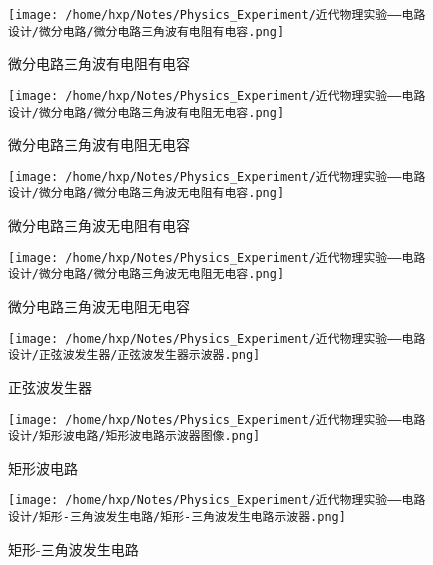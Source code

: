 \documentclass{article}
\begin{document}
\begin{figure}[H]
  \centering
  \texttt{[image: /home/hxp/Notes/Physics\_Experiment/近代物理实验——电路设计/微分电路/微分电路三角波有电阻有电容.png]}
  \caption{微分电路三角波有电阻有电容}
\end{figure}

\begin{figure}[H]
  \centering
  \texttt{[image: /home/hxp/Notes/Physics\_Experiment/近代物理实验——电路设计/微分电路/微分电路三角波有电阻无电容.png]}
  \caption{微分电路三角波有电阻无电容}
\end{figure}

\begin{figure}[H]
  \centering
  \texttt{[image: /home/hxp/Notes/Physics\_Experiment/近代物理实验——电路设计/微分电路/微分电路三角波无电阻有电容.png]}
  \caption{微分电路三角波无电阻有电容}
\end{figure}

\begin{figure}[H]
  \centering
  \texttt{[image: /home/hxp/Notes/Physics\_Experiment/近代物理实验——电路设计/微分电路/微分电路三角波无电阻无电容.png]}
  \caption{微分电路三角波无电阻无电容}
\end{figure}



\begin{figure}[H]
  \centering
  \texttt{[image: /home/hxp/Notes/Physics\_Experiment/近代物理实验——电路设计/正弦波发生器/正弦波发生器示波器.png]}
  \caption{正弦波发生器}
\end{figure}



\begin{figure}[H]
  \centering
  \texttt{[image: /home/hxp/Notes/Physics\_Experiment/近代物理实验——电路设计/矩形波电路/矩形波电路示波器图像.png]}
  \caption{矩形波电路}
\end{figure}



\begin{figure}[H]
  \centering
  \texttt{[image: /home/hxp/Notes/Physics\_Experiment/近代物理实验——电路设计/矩形-三角波发生电路/矩形-三角波发生电路示波器.png]}
  \caption{矩形-三角波发生电路}
\end{figure}
\end{document}

